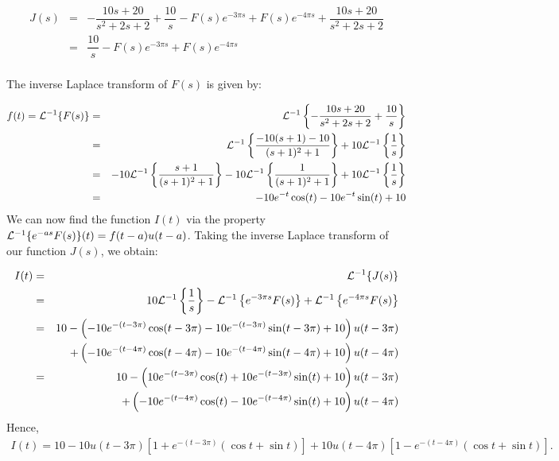 \documentclass[11pt]{article}
\begin{document}
\begin{solution}
\begin{eqnarray*}
J(s)  & = &   -\dfrac{10s+20}{s^2+2s+2} + \dfrac{10}{s} -F(s)e^{-3\pi s} +F(s)e^{-4\pi s} + \dfrac{10s+20}{s^2+2s+2} \\
& = &    \dfrac{10}{s} -F(s)e^{-3\pi s} +F(s)e^{-4\pi s} \\
\end{eqnarray*}

The inverse Laplace transform of $F(s)$ is given by:

\begin{eqnarray*}
f(t) = {\cal L}^{-1}\{ F(s) \} & = & {\cal L}^{-1}\left\{ -\dfrac{10s+20}{s^2+2s+2} + \dfrac{10}{s} \right\} \\
& = & {\cal L}^{-1}\left\{ \dfrac{-10(s+1)-10}{(s+1)^2+1}\right\} +10 {\cal L}^{-1}\left\{ \dfrac{1}{s}\right\}\\
& = & -10{\cal L}^{-1}\left\{ \dfrac{s+1}{(s+1)^2+1}\right\} -10 {\cal L}^{-1}\left\{ \dfrac{1}{(s+1)^2+1}\right\} +10 {\cal L}^{-1}\left\{ \dfrac{1}{s}\right\}\\
&=& -10e^{-t}\cos(t)-10e^{-t}\sin(t) +10
\end{eqnarray*}
We can now find the function $I(t)$ via the property $ {\cal L}^{-1}\{ e^{-as}F(s) \}(t) = f(t-a)u(t-a)$. Taking the inverse Laplace transform of our function $J(s)$, we obtain:

\begin{eqnarray*}
I(t) & = & {\cal L}^{-1}\{ J(s) \}  \\
&=& 10 {\cal L}^{-1}\left\{ \dfrac{1}{s}\right\}  -{\cal L}^{-1}\left\{ e^{-3\pi s} F(s)\right\} + {\cal L}^{-1}\left\{ e^{-4\pi s} F(s)\right\} \\
& = & 10 - \left(-10e^{-(t-3\pi)}\cos(t-3\pi)-10e^{-(t-3\pi)}\sin(t-3\pi) +10\right)u(t-3\pi) \\
& & + \left(-10e^{-(t-4\pi)}\cos(t-4\pi)-10e^{-(t-4\pi)}\sin(t-4\pi) +10\right)u(t-4\pi) \\
& = & 10 - \left(10e^{-(t-3\pi)}\cos(t)+10e^{-(t-3\pi)}\sin(t) +10\right)u(t-3\pi) \\
& & + \left(-10e^{-(t-4\pi)}\cos(t)-10e^{-(t-4\pi)}\sin(t) +10\right)u(t-4\pi) 
\end{eqnarray*} 
Hence,
\begin{gather*}
\boxed{I(t) = 10 - 10 u(t-3\pi) \left[ 1+e^{-(t-3\pi )} \left(\cos t+\sin t\right)\right] + 10 u(t-4\pi) \left[1-e^{-(t-4\pi)}(\cos t+\sin t)\right]}.
\end{gather*}

\end{solution}
\end{document}
